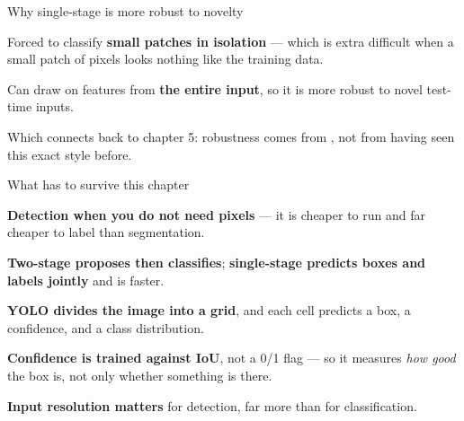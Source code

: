 \documentclass[aspectratio=169,11pt,t]{beamer}
\begin{document}
\begin{frame}[shrink=25]{Why single-stage is more robust to novelty}
\begin{minipage}[t]{0.494\textwidth}
\begin{icardwarn}
Forced to classify \textbf{small patches in isolation} --- which is extra difficult when a small patch of pixels looks nothing like the training data.
\end{icardwarn}
\end{minipage}%
\hfill
\begin{minipage}[t]{0.494\textwidth}
\begin{icardgood}
Can draw on features from \textbf{the entire input}, so it is more robust to novel test-time inputs.
\end{icardgood}
\end{minipage}%
{\fontsize{9.4}{12.6}\selectfont\color{fg2}Which connects back to chapter 5: robustness comes from , not from having seen this exact style before.\par}\vskip 4pt
\end{frame}

\begin{frame}[shrink=25]{What has to survive this chapter}
\begin{isteps}
\item \textbf{Detection when you do not need pixels} --- it is cheaper to run and far cheaper to label than segmentation.
\item \textbf{Two-stage proposes then classifies}; \textbf{single-stage predicts boxes and labels jointly} and is faster.
\item \textbf{YOLO divides the image into a grid}, and each cell predicts a box, a confidence, and a class distribution.
\item \textbf{Confidence is trained against IoU}, not a 0/1 flag --- so it measures \textit{how good} the box is, not only whether something is there.
\item \textbf{Input resolution matters} for detection, far more than for classification.
\end{isteps}
\end{frame}
\end{document}
